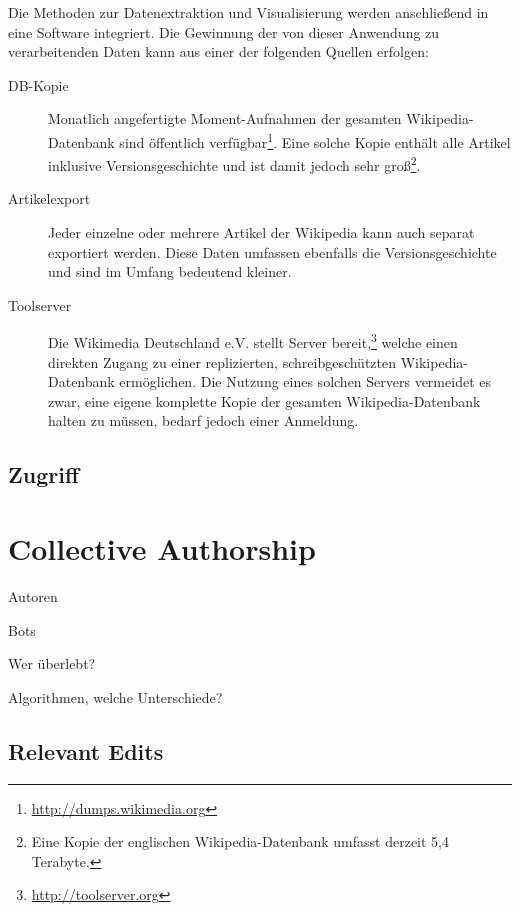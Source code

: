 Die Methoden zur Datenextraktion und Visualisierung werden anschließend in eine Software integriert.
Die Gewinnung der von dieser Anwendung zu verarbeitenden Daten kann aus einer der folgenden Quellen erfolgen:

\begin{description}
\item[DB-Kopie] Monatlich angefertigte Moment-Aufnahmen der gesamten Wikipedia-Datenbank sind öffentlich verfügbar\footnote{\url{http://dumps.wikimedia.org}}. Eine solche Kopie enthält alle Artikel inklusive Versionsgeschichte und ist damit jedoch sehr groß\footnote{Eine Kopie der englischen Wikipedia-Datenbank umfasst derzeit 5,4 Terabyte.}.
\item[Artikelexport] Jeder einzelne oder mehrere Artikel der Wikipedia kann auch separat exportiert werden. Diese Daten umfassen ebenfalls die Versionsgeschichte und sind im Umfang bedeutend kleiner.
\item[Toolserver] Die Wikimedia Deutschland e.V. stellt Server bereit,\footnote{\url{http://toolserver.org}} welche einen direkten Zugang zu einer replizierten, schreibgeschützten Wikipedia-Datenbank ermöglichen. Die Nutzung eines solchen Servers vermeidet es zwar, eine eigene komplette Kopie der gesamten Wikipedia-Datenbank halten zu müssen, bedarf jedoch einer Anmeldung.
\end{description}

\subsection{Zugriff}



\section{Collective Authorship}


\begin{todos}
    \item Autoren
    \item Bots
    \item Wer überlebt?
    \item Algorithmen, welche Unterschiede?
\end{todos}

\subsection{Relevant Edits}

